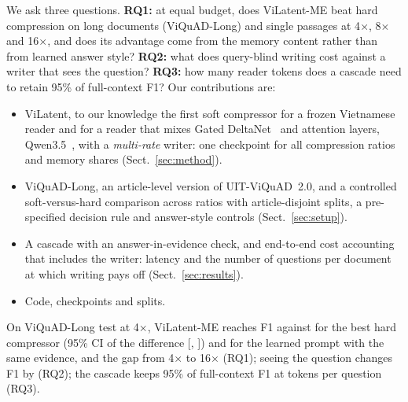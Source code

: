 We ask three questions.
\textbf{RQ1:} at equal budget, does ViLatent-ME beat hard compression on long documents (ViQuAD-Long) and single passages at 4$\times$, 8$\times$ and 16$\times$, and does its advantage come from the memory content rather than from learned answer style?
\textbf{RQ2:} what does query-blind writing cost against a writer that sees the question?
\textbf{RQ3:} how many reader tokens does a cascade need to retain 95\% of full-context F1?
Our contributions are:
\begin{itemize}
\item ViLatent, to our knowledge the first soft compressor for a frozen Vietnamese reader and for a reader that mixes Gated DeltaNet~\cite{yang2025gdn} and attention layers, Qwen3.5~\cite{qwen35}, with a \emph{multi-rate} writer: one checkpoint for all compression ratios and memory shares (Sect.~\ref{sec:method}).
\item ViQuAD-Long, an article-level version of UIT-ViQuAD~2.0, and a controlled soft-versus-hard comparison across ratios with article-disjoint splits, a pre-specified decision rule and answer-style controls (Sect.~\ref{sec:setup}).
\item A cascade with an answer-in-evidence check, and end-to-end cost accounting that includes the writer: latency and the number of questions per document at which writing pays off (Sect.~\ref{sec:results}).
\item Code, checkpoints and splits.
\end{itemize}
On ViQuAD-Long test at 4$\times$, ViLatent-ME reaches \tbd{} F1 against \tbd{} for the best hard compressor (95\% CI of the difference [\tbd, \tbd]) and \tbd{} for the learned prompt with the same evidence, and the gap \tbd{} from 4$\times$ to 16$\times$ (RQ1); seeing the question changes F1 by \tbd{} (RQ2); the cascade keeps 95\% of full-context F1 at \tbd{} tokens per question (RQ3).

